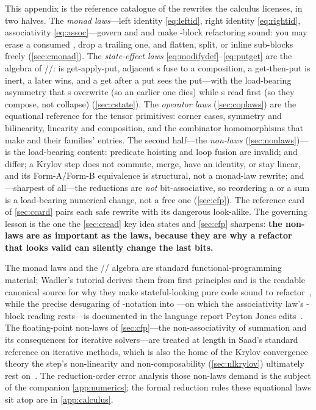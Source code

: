 \summarysection
This appendix is the reference catalogue of the rewrites the calculus licenses, in
two halves. The \emph{monad laws}---left identity \eqref{eq:leftid}, right identity
\eqref{eq:rightid}, associativity \eqref{eq:assoc}---govern \code{>>=} and
 and make -block refactoring sound: you may erase a consumed
, drop a trailing one, and flatten, split, or inline sub-blocks freely
(\cref{sec:cmonad}). The \emph{state-effect laws} \eqref{eq:modifydef}--\eqref{eq:putget}
are the algebra of //:  is get-apply-put,
adjacent s fuse to a composition, a get-then-put is inert, a later
 wins, and a get after a put sees the put---with the load-bearing asymmetry
that s overwrite (so an earlier one dies) while s read first
(so they compose, not collapse) (\cref{sec:cstate}). The \emph{operator laws}
(\cref{sec:coplaws}) are the equational reference for the tensor primitives:
 corner cases,  symmetry and bilinearity, 
linearity and composition, and the combinator homomorphisms that make
 and  their families' entries. The
second half---the \emph{non-laws} (\cref{sec:nonlaws})---is the load-bearing content:
predicate hoisting and loop fusion are invalid;  and 
differ; a Krylov step does not commute, merge, have an identity, or stay linear, and
its Form-A/Form-B equivalence is structural, not a monad-law rewrite; and---sharpest
of all---the reductions are \emph{not} bit-associative, so reordering a  or
a  sum is a load-bearing numerical change, not a free one
(\cref{sec:cfp}). The reference card of \cref{sec:ccard} pairs each safe rewrite with
its dangerous look-alike. The governing lesson is the one the \cref{sec:cread} key
idea states and \cref{sec:cfp} sharpens: \textbf{the non-laws are as important as the
laws, because they are why a refactor that looks valid can silently change the last
bits.}

\furtherreading
The monad laws and the // algebra are standard
functional-programming material; Wadler's tutorial derives them from first principles
and is the readable canonical source for why they make stateful-looking pure code
sound to refactor~\citep{wadler1995monads}, while the precise desugaring of
-notation into \code{>>=}---on which the associativity law's
-block reading rests---is documented in the language report Peyton Jones
edits~\citep{peytonjones2003}. The floating-point non-laws of \cref{sec:cfp}---the
non-associativity of summation and its consequences for iterative solvers---are
treated at length in Saad's standard reference on iterative methods, which is also
the home of the Krylov convergence theory the step's non-linearity and
non-composability (\cref{sec:nlkrylov}) ultimately rest on~\citep{saad2003}. The
reduction-order error analysis those non-laws demand is the subject of the companion
\cref{app:numerics}; the formal reduction rules these equational laws sit atop are in
\cref{app:calculus}.
